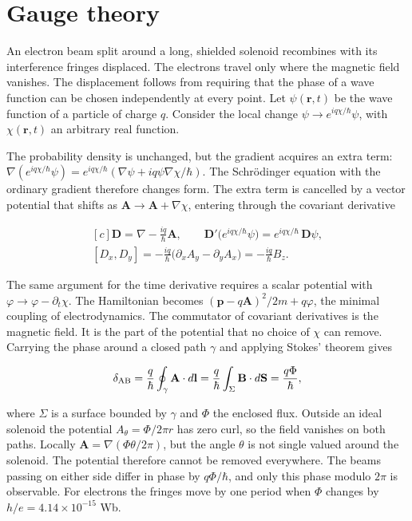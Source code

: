 \documentclass[11pt,oneside]{book}
\newenvironment{centeredalign}{\[\begin{gathered}[c]}{\end{gathered}\]}
\begin{document}
\clearpage

\section{Gauge theory}

\label{topic:gauge-theory}

An electron beam split around a long, shielded solenoid recombines with its interference fringes displaced. The electrons travel only where the magnetic field vanishes. The displacement follows from requiring that the phase of a wave function can be chosen independently at every point. Let \(\psi(\mathbf r,t)\) be the wave function of a particle of charge \(q\). Consider the local change \(\psi\to e^{iq\chi/\hbar}\psi\), with \(\chi(\mathbf r,t)\) an arbitrary real function.

The probability density is unchanged, but the gradient acquires an extra term: \(\nabla(e^{iq\chi/\hbar}\psi)=e^{iq\chi/\hbar}(\nabla\psi+iq\psi\nabla\chi/\hbar)\). The Schrödinger equation with the ordinary gradient therefore changes form. The extra term is cancelled by a vector potential that shifts as \(\mathbf A\to\mathbf A+\nabla\chi\), entering through the covariant derivative

\begin{centeredalign}
\mathbf D=\nabla-\frac{iq}{\hbar}\mathbf A,\qquad
\mathbf D'\big(e^{iq\chi/\hbar}\psi\big)=e^{iq\chi/\hbar}\,\mathbf D\psi,\\
[D_x,D_y]=-\frac{iq}{\hbar}\big(\partial_xA_y-\partial_yA_x\big)=-\frac{iq}{\hbar}B_z.
\end{centeredalign}

The same argument for the time derivative requires a scalar potential with \(\varphi\to\varphi-\partial_t\chi\). The Hamiltonian becomes \((\mathbf p-q\mathbf A)^2/2m+q\varphi\), the minimal coupling of electrodynamics. The commutator of covariant derivatives is the magnetic field. It is the part of the potential that no choice of \(\chi\) can remove. Carrying the phase around a closed path \(\gamma\) and applying Stokes' theorem gives

\begin{centeredalign}
\delta_{\rm AB}=\frac{q}{\hbar}\oint_\gamma\mathbf A\cdot d\mathbf l
=\frac{q}{\hbar}\int_\Sigma\mathbf B\cdot d\mathbf S=\frac{q\Phi}{\hbar},
\end{centeredalign}

where \(\Sigma\) is a surface bounded by \(\gamma\) and \(\Phi\) the enclosed flux. Outside an ideal solenoid the potential \(A_\theta=\Phi/2\pi r\) has zero curl, so the field vanishes on both paths. Locally \(\mathbf A=\nabla(\Phi\theta/2\pi)\), but the angle \(\theta\) is not single valued around the solenoid. The potential therefore cannot be removed everywhere. The beams passing on either side differ in phase by \(q\Phi/\hbar\), and only this phase modulo \(2\pi\) is observable. For electrons the fringes move by one period when \(\Phi\) changes by \(h/e=4.14\times10^{-15}\) Wb.
\end{document}
